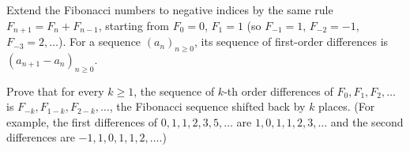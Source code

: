 Extend the Fibonacci numbers to negative indices by the same rule $F_{n+1}=F_n+F_{n-1}$, starting from $F_0=0$, $F_1=1$ (so $F_{-1}=1$, $F_{-2}=-1$, $F_{-3}=2,\dots$). For a sequence $(a_n)_{n\ge0}$, its sequence of first-order differences is $(a_{n+1}-a_n)_{n\ge0}$.

Prove that for every $k\ge1$, the sequence of $k$-th order differences of $F_0,F_1,F_2,\dots$ is $F_{-k},F_{1-k},F_{2-k},\dots$, the Fibonacci sequence shifted back by $k$ places. (For example, the first differences of $0,1,1,2,3,5,\dots$ are $1,0,1,1,2,3,\dots$ and the second differences are $-1,1,0,1,1,2,\dots$.)
